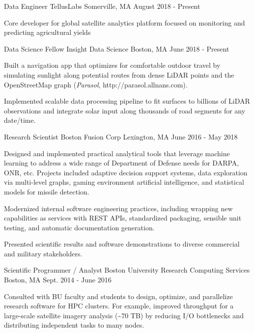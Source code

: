 \documentclass[11pt, letter]{awesome-cv}
\begin{document}
\cventry
    {Data Engineer}
    {TellusLabs}
    {Somerville, MA}
    {August 2018 - Present}
    {
    \begin{cvitems}
      \item Core developer for global satellite analytics platform focused on monitoring and predicting agricultural yields
    \end{cvitems}
    }
\begin{cventries}
  \cventry
    {Data Science Fellow}
    {Insight Data Science}
    {Boston, MA}
    {June 2018 - Present}
    {
    \begin{cvitems}
      \item Built a navigation app that optimizes for comfortable outdoor travel by simulating sunlight along potential routes from dense LiDAR points and the OpenStreetMap graph (\emph{Parasol}, http://parasol.allnans.com).
      \item Implemented scalable data processing pipeline to fit surfaces to billions of LiDAR observations and integrate solar input along thousands of road segments for any date/time.
    \end{cvitems}
    }
  \cventry
    {Research Scientist}
    {Boston Fusion Corp}
    {Lexington, MA}
    {June 2016 - May 2018}
    {
      \begin{cvitems}
        \item {Designed and implemented practical analytical tools that leverage machine learning to address a wide range of Department of Defense needs for DARPA, ONR, etc. Projects included adaptive decision support systems, data exploration via multi-level graphs, gaming environment artificial intelligence, and statistical models for missile detection.}
        \item {Modernized internal software engineering practices, including wrapping new capabilities as services with REST APIs, standardized packaging, sensible unit testing, and automatic documentation generation.}
        \item {Presented scientific results and software demonstrations to diverse commercial and military stakeholders.}
      \end{cvitems}
    }
  \cventry
    {Scientific Programmer / Analyst}
    {Boston University Research Computing Services}
    {Boston, MA}
    {Sept. 2014 - June 2016}
    {
      \begin{cvitems}
        \item {Consulted with BU faculty and students to design, optimize, and parallelize research software for HPC clusters. For example, improved throughput for a large-scale satellite imagery analysis (\textasciitilde70 TB) by reducing I/O bottlenecks and distributing independent tasks to many nodes.}

\end{cvitems}}
\end{cventries}
\end{document}
